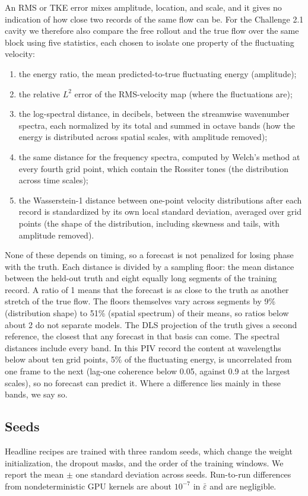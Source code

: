 \documentclass[conf]{new-aiaa}
\begin{document}
An RMS or TKE error mixes amplitude, location, and scale, and it gives no indication of how close two records of the same flow can be. For the Challenge 2.1 cavity we therefore also compare the free rollout and the true flow over the same block using five statistics, each chosen to isolate one property of the fluctuating velocity:
\begin{enumerate}
  \item the energy ratio, the mean predicted-to-true fluctuating energy (amplitude);
  \item the relative $L^2$ error of the RMS-velocity map (where the fluctuations are);
  \item the log-spectral distance, in decibels, between the streamwise wavenumber spectra, each normalized by its total and summed in octave bands (how the energy is distributed across spatial scales, with amplitude removed);
  \item the same distance for the frequency spectra, computed by Welch's method at every fourth grid point, which contain the Rossiter tones (the distribution across time scales);
  \item the Wasserstein-1 distance between one-point velocity distributions after each record is standardized by its own local standard deviation, averaged over grid points (the shape of the distribution, including skewness and tails, with amplitude removed).
\end{enumerate}
None of these depends on timing, so a forecast is not penalized for losing phase with the truth. Each distance is divided by a sampling floor: the mean distance between the held-out truth and eight equally long segments of the training record. A ratio of 1 means that the forecast is as close to the truth as another stretch of the true flow. The floors themselves vary across segments by 9\% (distribution shape) to 51\% (spatial spectrum) of their means, so ratios below about 2 do not separate models. The DLS projection of the truth gives a second reference, the closest that any forecast in that basis can come. The spectral distances include every band. In this PIV record the content at wavelengths below about ten grid points, 5\% of the fluctuating energy, is uncorrelated from one frame to the next (lag-one coherence below 0.05, against 0.9 at the largest scales), so no forecast can predict it. Where a difference lies mainly in these bands, we say so.

\subsection{Seeds}
Headline recipes are trained with three random seeds, which change the weight initialization, the dropout masks, and the order of the training windows. We report the mean $\pm$ one standard deviation across seeds. Run-to-run differences from nondeterministic GPU kernels are about $10^{-7}$ in $\bar\varepsilon$ and are negligible.
\end{document}
